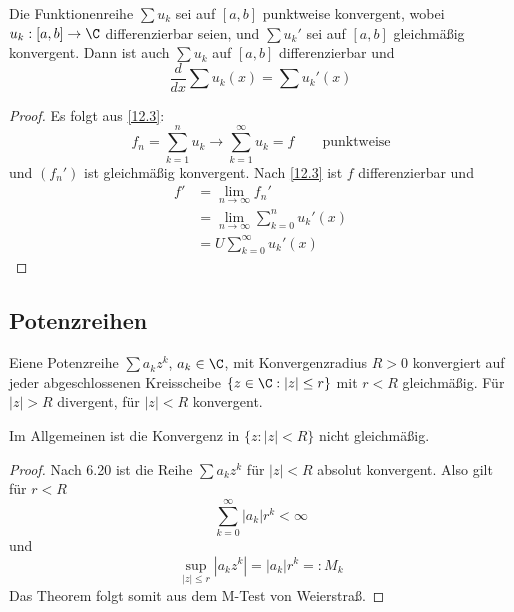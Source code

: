 \documentclass[a4paper,10pt]{scrartcl}
\begin{document}
\setcounter{thm}{7}
\begin{st}
\label{12.8}
Die Funktionenreihe $\sum u_k$ sei auf $[a,b]$ punktweise konvergent, wobei
$u_k:[a,b]\to\C$ differenzierbar seien, und $\sum u_k'$ sei auf $[a,b]$ gleichmäßig konvergent.
Dann ist auch $\sum u_k$ auf $[a,b]$ differenzierbar und
\[
\frac d{dx}\sum u_k(x)=\sum u_k'(x)
\]
\begin{proof}
Es folgt aus \ref{12.3}:
\[
f_n=\sum_{k=1}^n u_k\longrightarrow \sum_{k=1}^\infty u_k=f \qquad \text{punktweise}
\]
und $(f_n')$ ist gleichmäßig konvergent.
Nach \ref{12.3} ist $f$ differenzierbar und
\begin{align*}
f'&=\lim_{n\to\infty} f_n' \\
&=\lim_{n\to\infty}\sum_{k=0}^n u_k'(x)\\
&=U\sum_{k=0}^\infty u_k'(x)
\end{align*}
\end{proof}
\end{st}

\subsection{Potenzreihen}

\begin{thm}
\label{12.9}
Eiene Potenzreihe $\sum a_kz^k$, $a_k\in\C$, mit Konvergenzradius $R>0$
konvergiert auf jeder abgeschlossenen Kreisscheibe $\{z\in\C:|z|\le r\}$ mit $r<R$ gleichmäßig.
Für $|z|>R$ divergent, für $|z|<R$ konvergent.
\begin{note}
Im Allgemeinen ist die Konvergenz in $\{z:|z|<R\}$ nicht gleichmäßig.
\end{note}
\begin{proof}
Nach 6.20 ist die Reihe $\sum a_kz^k$ für $|z|<R$ absolut konvergent.
Also gilt für $r<R$ 
\[
\sum_{k=0}^\infty |a_k|r^k < \infty
\]
und
\[
\sup_{|z|\le r}|a_kz^k| = |a_k|r^k =: M_k
\]
Das Theorem folgt somit aus dem M-Test von Weierstraß.
\end{proof}
\end{thm}
\end{document}
